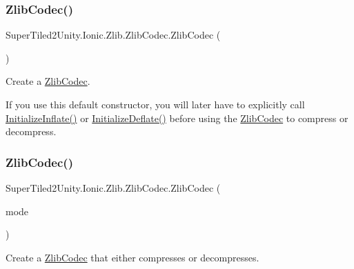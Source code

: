 \subsubsection{\texorpdfstring{Zlib\+Codec()}{ZlibCodec()}\hspace{0.1cm}{\footnotesize\ttfamily [1/2]}}
{\footnotesize\ttfamily Super\+Tiled2\+Unity.\+Ionic.\+Zlib.\+Zlib\+Codec.\+Zlib\+Codec (\begin{DoxyParamCaption}{ }\end{DoxyParamCaption})}



Create a \mbox{\hyperlink{class_super_tiled2_unity_1_1_ionic_1_1_zlib_1_1_zlib_codec}{Zlib\+Codec}}. 

If you use this default constructor, you will later have to explicitly call \mbox{\hyperlink{class_super_tiled2_unity_1_1_ionic_1_1_zlib_1_1_zlib_codec_aa50e75125aea07774abc7a65b10e1926}{Initialize\+Inflate()}} or \mbox{\hyperlink{class_super_tiled2_unity_1_1_ionic_1_1_zlib_1_1_zlib_codec_a8554eab826711fc8aaccfc039cf2f372}{Initialize\+Deflate()}} before using the \mbox{\hyperlink{class_super_tiled2_unity_1_1_ionic_1_1_zlib_1_1_zlib_codec}{Zlib\+Codec}} to compress or decompress. \mbox{\label{class_super_tiled2_unity_1_1_ionic_1_1_zlib_1_1_zlib_codec_a447cfe7e7f49e1b5512b7942acb901a4}} 
\subsubsection{\texorpdfstring{Zlib\+Codec()}{ZlibCodec()}\hspace{0.1cm}{\footnotesize\ttfamily [2/2]}}
{\footnotesize\ttfamily Super\+Tiled2\+Unity.\+Ionic.\+Zlib.\+Zlib\+Codec.\+Zlib\+Codec (\begin{DoxyParamCaption}\item[{\mbox{\hyperlink{namespace_super_tiled2_unity_1_1_ionic_1_1_zlib_ad5b7635d92497e1c905e5de82eb1c6b1}{Compression\+Mode}}}]{mode }\end{DoxyParamCaption})}



Create a \mbox{\hyperlink{class_super_tiled2_unity_1_1_ionic_1_1_zlib_1_1_zlib_codec}{Zlib\+Codec}} that either compresses or decompresses. 


